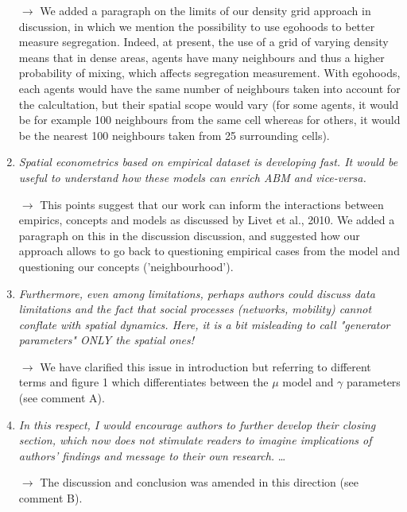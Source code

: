 \documentclass[11pt,a4paper,sans]{moderncv}        %
\begin{document}
\begin{enumerate}
  $\rightarrow$ We added a paragraph on the limits of our density grid approach in discussion, in which we mention the possibility to use egohoods to better measure segregation. Indeed, at present, the use of a grid of varying density means that in dense areas, agents have many neighbours and thus a higher probability of mixing, which affects segregation measurement. With egohoods, each agents would have the same number of neighbours taken into account for the calcultation, but their spatial scope would vary (for some agents, it would be for example 100 neighbours from the same cell whereas for others, it would be the nearest 100 neighbours taken from 25 surrounding cells).
  
  \medskip
  
   \item \textit{Spatial econometrics based on empirical dataset is developing fast. It would be useful to understand how these models can enrich ABM and vice-versa.}
   
     $\rightarrow$ This points suggest that our work can inform the interactions between empirics, concepts and models as discussed by Livet et al., 2010. We added a paragraph on this in the discussion discussion, and suggested how our approach allows to go back to questioning empirical cases from the model and questioning our concepts ('neighbourhood').

  \medskip

  \item\textit{Furthermore, even among limitations, perhaps authors could discuss data limitations and the fact that social processes (networks, mobility) cannot conflate with spatial dynamics. Here, it is a bit misleading to call "generator parameters" ONLY the spatial ones!}
  
  $\rightarrow$ We have clarified this issue in introduction but referring to different terms and figure 1 which differentiates between the $\mu$ model and $\gamma$ parameters (see comment A).
 
 \medskip
 
 
  \item\textit{In this respect, I would encourage authors to further develop their closing section, which now does not stimulate readers to imagine implications of authors' findings and message to their own research.} \ldots
  
  $\rightarrow$ The discussion and conclusion was amended in this direction (see comment B).


\end{enumerate}






\end{document}
